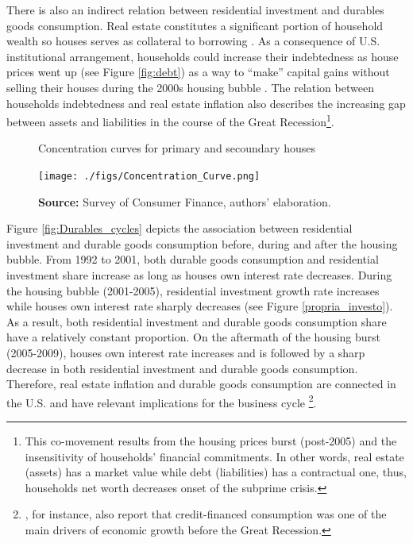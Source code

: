 \documentclass[11pt]{article}
\begin{document}
There is also an indirect relation between residential investment and durables goods consumption. Real estate constitutes a significant portion of household wealth so houses serves as collateral to borrowing \cite{teixeira_uma_2011}. 
As a consequence of U.S. institutional arrangement, households could increase their indebtedness as house
prices went up (see Figure \ref{fig:debt}) as a way to ``make'' capital gains without selling their houses during the 2000s housing bubble \cite{teixeira_crescimento_2015,hay_failure_2013}. 
The relation between households indebtedness and real estate inflation also describes the increasing gap between assets and liabilities in the course of the Great Recession\footnote{This co-movement results from the housing prices burst (post-2005) and  the insensitivity of households’ financial commitments. In other words, real estate (assets) has a market value while debt (liabilities) has a contractual one, thus, households net worth decreases
onset of the subprime crisis.}. 

\begin{figure}[htb]
    \centering
        \caption{Concentration curves for primary and secoundary houses} 
    \texttt{[image: ./figs/Concentration\_Curve.png]}
    \label{fig:concentration}
    \caption*{\textbf{Source:} Survey of Consumer Finance, authors’ elaboration.}
\end{figure}



Figure \ref{fig:Durables_cycles} depicts the association between residential investment and durable goods consumption before, during and after the housing bubble.
From 1992 to 2001, both durable goods consumption and residential investment share increase as long as houses own interest rate decreases.
During the housing bubble (2001-2005), residential investment growth rate increases while houses own interest rate sharply decreases (see Figure \ref{propria_investo}).
As a result, both residential investment and durable goods consumption share have a relatively constant proportion.
On the aftermath of the housing burst (2005-2009), houses own interest rate increases and is followed by a sharp decrease in both residential investment and durable goods consumption.
Therefore, real estate inflation and durable goods consumption are connected in the U.S. and have relevant implications for the business cycle \footnote{\textcites{zezza_u.s._2008}{barba_rising_2009}, for instance, also report that credit-financed consumption was one of the main drivers of economic growth before the Great Recession.}. 
\end{document}
